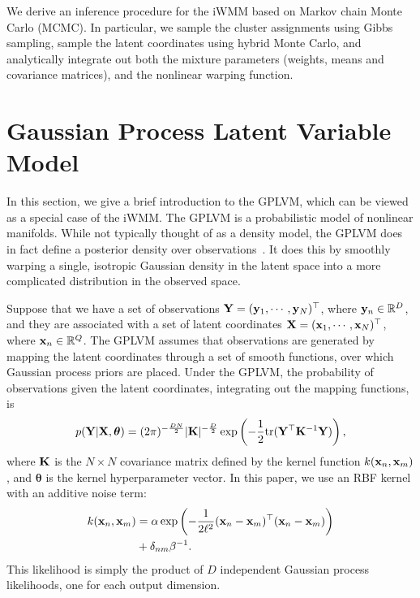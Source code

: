 We derive an inference procedure for the iWMM based on Markov chain Monte Carlo (MCMC).  In particular, we sample the cluster assignments using Gibbs sampling, sample the latent coordinates using hybrid Monte Carlo, and analytically integrate out both the mixture parameters (weights, means and covariance matrices), and the nonlinear warping function. 






\section{Gaussian Process Latent Variable Model}

In this section, we give a brief introduction to the GPLVM, which can be viewed as a special case of the iWMM.
The GPLVM is a probabilistic model of nonlinear manifolds.
While not typically thought of as a density model, the GPLVM does in fact define a posterior density over observations~\cite{nickisch2010gaussian}.
It does this by smoothly warping a single, isotropic Gaussian density in the latent space into a more complicated distribution in the observed space.  


Suppose that we have a set of observations
$\mathbf{Y} = ({\bf{y}}_{1},\cdots,{\bf{y}}_{N})^{\top}$,
where ${\bf{y}}_{n}\in{\mathbb R}^{D}$,
and they are associated with a set of latent coordinates
$\mathbf{X} = ({\bf{x}}_{1},\cdots,{\bf{x}}_{N})^{\top}$,
where ${\bf{x}}_{n}\in{\mathbb R}^{Q}$.
The GPLVM assumes that observations are generated by mapping the latent coordinates through a set of smooth functions, over which Gaussian process priors are placed.
Under the GPLVM, the probability of observations given the latent coordinates, integrating out the mapping functions, is
\begin{align}
p(\mathbf{Y} | \mathbf{X},\bm{\theta})  = (2 \pi)^{-\frac{DN}{2}}  |\mathbf{K}|^{-\frac{D}{2}} \exp \left( -\frac{1}{2} {\rm tr}( \mathbf{Y}^{\top} \mathbf{K}^{-1} \mathbf{Y}) \right),
\label{eq:py_x}
\end{align}
where $\mathbf{K}$ is the $N \times N$ covariance matrix defined 
by the kernel function $k({\bf{x}}_{n},{\bf{x}}_{m})$,
and $\bm{\theta}$ is the kernel hyperparameter vector.
In this paper, we use an RBF kernel with an additive noise term:
\begin{align}
k({\bf{x}}_{n},{\bf{x}}_{m}) &= \alpha \exp\left( - \frac{1}{2 \ell^2}({\bf{x}}_n - {\bf{x}}_m)^{\top} ({\bf{x}}_n - {\bf{x}}_m) \right) \nonumber \\
&+ \delta_{nm} \beta^{-1}.
\end{align}
This likelihood is simply the product of $D$ independent Gaussian process likelihoods, one for each output dimension.


